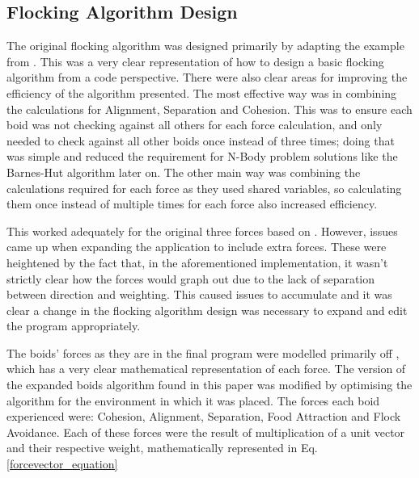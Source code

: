 \subsection{Flocking Algorithm Design}
The original flocking algorithm was designed primarily by adapting the example from \citet{flockingprocessingorg}. This was a very clear representation of how to design a basic flocking algorithm from a code perspective. There were also clear areas for improving the efficiency of the algorithm presented. The most effective way was in combining the calculations for Alignment, Separation and Cohesion. This was to ensure each boid was not checking against all others for each force calculation, and only needed to check against all other boids once instead of three times; doing that was simple and reduced the requirement for N-Body problem solutions like the Barnes-Hut algorithm later on. The other main way was combining the calculations required for each force as they used shared variables, so calculating them once instead of multiple times for each force also increased efficiency.

This worked adequately for the original three forces based on \citet{Reynolds:1987:FHS:37402.37406}. However, issues came up when expanding the application to include extra forces. These were heightened by the fact that, in the aforementioned implementation, it wasn't strictly clear how the forces would graph out due to the lack of separation between direction and weighting. This caused issues to accumulate and it was clear a change in the flocking algorithm design was necessary to expand and edit the program appropriately.


The boids' forces as they are in the final program were modelled primarily off \citet{4604156}, which has a very clear mathematical representation of each force. The version of the expanded boids algorithm found in this paper was modified by optimising the algorithm for the environment in which it was placed. The forces each boid experienced were: Cohesion, Alignment, Separation, Food Attraction and Flock Avoidance. Each of these forces were the result of multiplication of a unit vector and their respective weight, mathematically represented in Eq.\ref{forcevector_equation}



